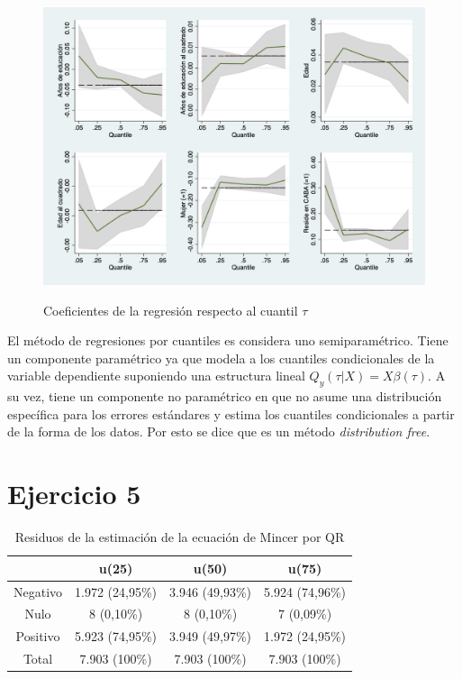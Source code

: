 \documentclass[11pt]{article}
\begin{document}
\begin{figure}[H]
	\caption{Coeficientes de la regresión respecto al cuantil $\tau$}
	\centering
	\includegraphics[width=0.8\linewidth]{4.png}
	\label{fig: 4}
\end{figure}

El método de regresiones por cuantiles es considera uno semiparamétrico. Tiene un componente paramétrico ya que modela a los cuantiles condicionales de la variable dependiente suponiendo una estructura lineal $Q_y(\tau | X ) = X \beta(\tau)$. A su vez, tiene un componente no paramétrico en que no asume una distribución específica para los errores estándares y estima los cuantiles condicionales a partir de la forma de los datos. Por esto se dice que es un método \textit{distribution free}.

\section*{Ejercicio 5}

\begin{table}[H]
    \centering
     \caption{Residuos de la estimación de la ecuación de Mincer por QR}
    \begin{tabular}{|c|c|c|c|}
    \hline
         & \textbf{u(25)} & \textbf{u(50)} & \textbf{u(75)}\\ \hline
    Negativo & 1.972 (24,95\%) & 3.946 (49,93\%) & 5.924 (74,96\%) \\
    Nulo     & 8 (0,10\%) & 8 (0,10\%) & 7 (0,09\%) \\
    Positivo & 5.923 (74,95\%) & 3.949 (49,97\%) & 1.972 (24,95\%) \\ \hline
    Total    & 7.903 (100\%) & 7.903 (100\%) & 7.903 (100\%) \\ \hline
    \end{tabular}
    \label{tab:residuos_QR}
\end{table}
\end{document}
